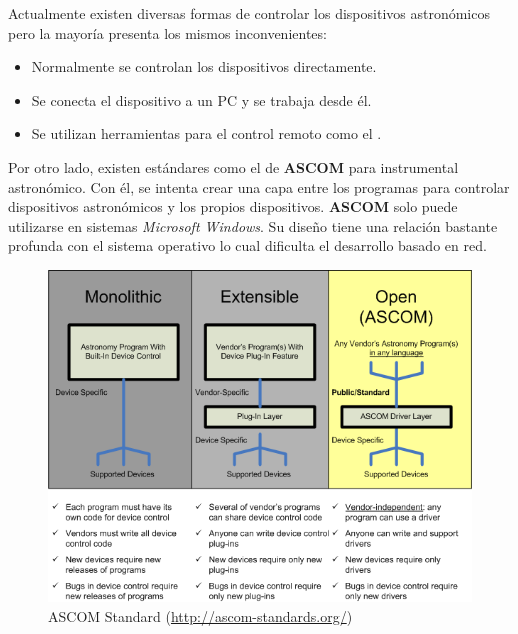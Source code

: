 Actualmente existen diversas formas de controlar los dispositivos astronómicos pero la mayoría presenta los mismos inconvenientes:

\begin{itemize}
  \item Normalmente se controlan los dispositivos directamente.
  \item Se conecta el dispositivo a un PC y se trabaja desde él.
  \item Se utilizan herramientas para el control remoto como el .
\end{itemize}

\bigskip

Por otro lado, existen estándares como el de \textbf{ASCOM} para instrumental astronómico. Con él, se intenta crear una capa entre los programas para controlar dispositivos astronómicos y los propios dispositivos. \textbf{ASCOM} solo puede utilizarse en sistemas \textit{Microsoft Windows}. Su diseño tiene una relación bastante profunda con el sistema operativo lo cual dificulta el desarrollo basado en red.

\bigskip
\begin{figure}[!ht]
  \begin{center}
    \includegraphics[width=1\textwidth]{../images/ascom.png}
    \caption[ASCOM Standard]{ASCOM Standard (\href{http://ascom-standards.org/}{http://ascom-standards.org/})}
    \label{fig:ascom}
  \end{center}
\end{figure}


